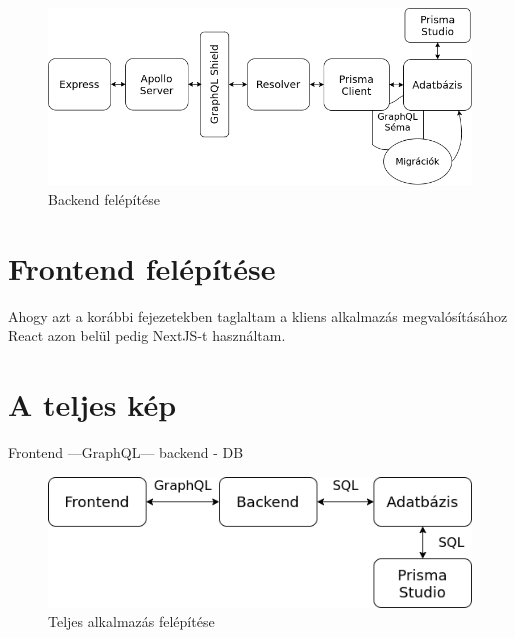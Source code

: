 \begin{figure}[!ht]
  \centering
  \includegraphics[width=150mm, keepaspectratio]{figures/backend.png}
  \caption{Backend felépítése}
  \label{fig:backend}
\end{figure}


\section{Frontend felépítése}
Ahogy azt a korábbi fejezetekben taglaltam a kliens alkalmazás megvalósításához React azon belül pedig NextJS-t használtam.

\section{A teljes kép}
Frontend ---GraphQL--- backend - DB

\begin{figure}[!ht]
  \centering
  \includegraphics[width=150mm, keepaspectratio]{figures/architecture.png}
  \caption{Teljes alkalmazás felépítése}
  \label{fig:architecture}
\end{figure}